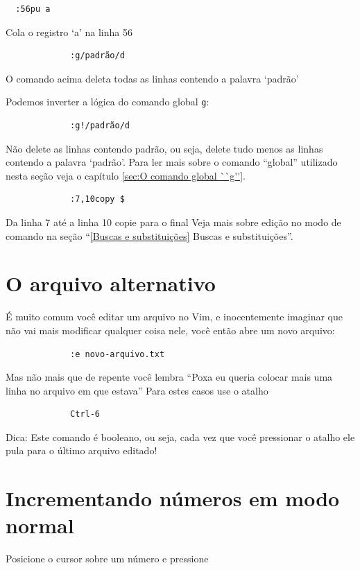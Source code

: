 \documentclass[10pt,a4paper,openany]{book}
\begin{document}
\begin{verbatim}
  :56pu a
\end{verbatim}

Cola o registro `a' na linha 56

\begin{verbatim}
			 :g/padrão/d
\end{verbatim}

O comando acima deleta todas as linhas contendo a palavra `padrão'

Podemos inverter a lógica do comando global \verb+g+:

\begin{verbatim}
			 :g!/padrão/d
\end{verbatim}


Não delete as linhas contendo padrão, ou seja, delete tudo menos as linhas
contendo a palavra `padrão'. Para ler mais sobre o comando ``global'' utilizado 
nesta seção veja o capítulo \ref{sec:O comando global ``g''}.

\begin{verbatim}
			 :7,10copy $
\end{verbatim}

Da linha 7 até a linha 10 copie para o final
Veja mais sobre edição no modo de comando na seção ``\ref{Buscas e
substituições} Buscas e substituições''.

\section{O arquivo alternativo}
\label{O arquivo alternativo}

É muito comum você editar um arquivo no Vim, e inocentemente imaginar
que não vai mais modificar qualquer coisa nele, você então abre um
novo arquivo:

\begin{verbatim}
			 :e novo-arquivo.txt
\end{verbatim}

Mas não mais que de repente você lembra ``Poxa eu queria colocar mais
uma linha no arquivo em que estava'' Para estes casos use o atalho

\begin{verbatim}
			 Ctrl-6
\end{verbatim}

Dica: Este comando é booleano, ou seja, cada vez que você pressionar o atalho
ele pula para o último arquivo editado!


\section{Incrementando números em modo normal}\label{Incrementando números em modo normal}
Posicione o cursor sobre um número e pressione
\end{document}
